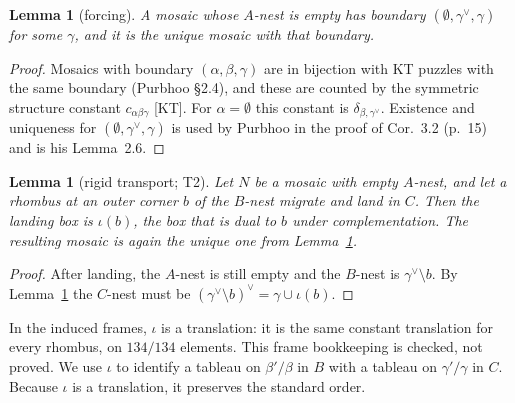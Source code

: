 \documentclass[11pt]{article}
\newtheorem{lemma}[theorem]{Lemma}
\theoremstyle{definition}
\begin{document}
\begin{lemma}[forcing]\label{lem:forcing}
A mosaic whose $A$-nest is empty has boundary $(\emptyset,\gamma^\vee,\gamma)$ for some $\gamma$, and it is the unique mosaic with
that boundary.
\end{lemma}
\begin{proof}
Mosaics with boundary $(\alpha,\beta,\gamma)$ are in bijection with KT puzzles with the same boundary (Purbhoo \S2.4), and these
are counted by the symmetric structure constant $c_{\alpha\beta\gamma}$ [KT]. For $\alpha=\emptyset$ this constant is
$\delta_{\beta,\gamma^\vee}$. Existence and uniqueness for $(\emptyset,\gamma^\vee,\gamma)$ is used by Purbhoo in the proof of
Cor.~3.2 (p.~15) and is his Lemma~2.6.
\end{proof}

\begin{lemma}[rigid transport; T2]\label{lem:rigid}
Let $N$ be a mosaic with empty $A$-nest, and let a rhombus at an outer corner $b$ of the $B$-nest migrate and land in $C$. Then the
landing box is $\iota(b)$, the box that is dual to $b$ under complementation. The resulting mosaic is again the unique one from
Lemma~\ref{lem:forcing}.
\end{lemma}
\begin{proof}
After landing, the $A$-nest is still empty and the $B$-nest is $\gamma^\vee\setminus b$. By Lemma~\ref{lem:forcing} the $C$-nest
must be $(\gamma^\vee\setminus b)^\vee=\gamma\cup\iota(b)$.
\end{proof}
In the induced frames, $\iota$ is a translation: it is the same constant translation for every rhombus, on $134/134$ elements. This
frame bookkeeping is checked, not proved. We use $\iota$ to identify a tableau on $\beta'/\beta$ in $B$ with a tableau on
$\gamma'/\gamma$ in $C$. Because $\iota$ is a translation, it preserves the standard order.
\end{document}

